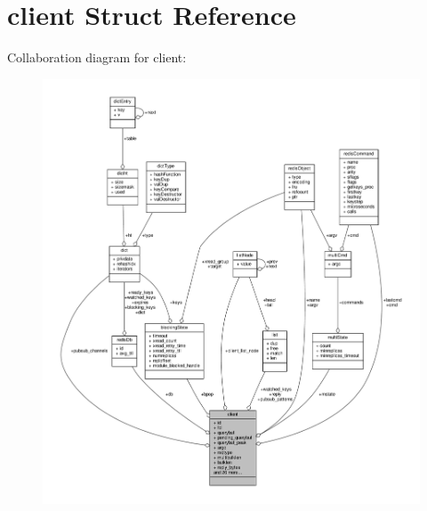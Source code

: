 \hypertarget{structclient}{}\section{client Struct Reference}
\label{structclient}


Collaboration diagram for client\+:\nopagebreak
\begin{figure}[H]
\begin{center}
\leavevmode
\includegraphics[width=350pt]{structclient__coll__graph}
\end{center}
\end{figure}
